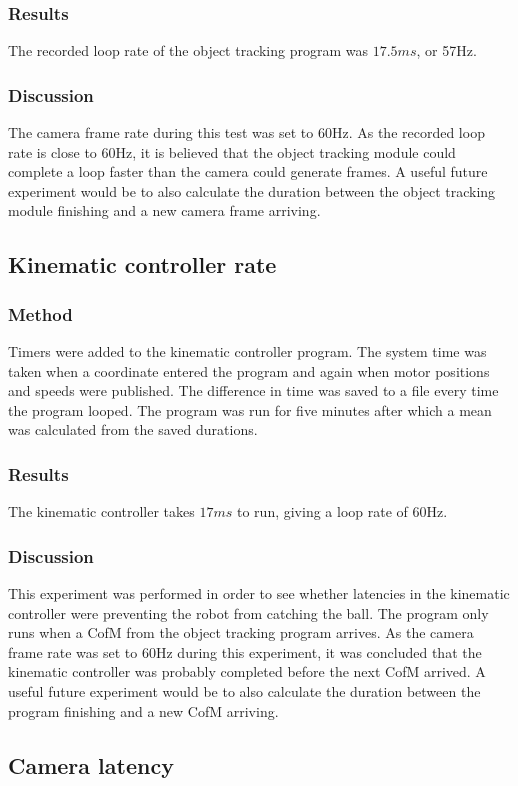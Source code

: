 \documentclass[conference]{IEEEtran}
\begin{document}
\subsubsection{Results}
The recorded loop rate of the object tracking program was $17.5ms$, or 57Hz.
\subsubsection{Discussion}
The camera frame rate during this test was set to 60Hz. As the recorded loop rate is close to 60Hz, it is believed that the object tracking module could complete a loop faster than the camera could generate frames. A useful future experiment would be to also calculate the duration between the object tracking module finishing and a new camera frame arriving.


\subsection{Kinematic controller rate}
\subsubsection{Method}
Timers were added to the kinematic controller program. The system time was taken when a coordinate entered the program and again when motor positions and speeds were published. The difference in time was saved to a file every time the program looped. The program was run for five minutes after which a mean was calculated from the saved durations.
\subsubsection{Results}
The kinematic controller takes $17ms$ to run, giving a loop rate of 60Hz.
\subsubsection{Discussion}
This experiment was performed in order to see whether latencies in the kinematic controller were preventing the robot from catching the ball. The program only runs when a CofM from the object tracking program arrives. As the camera frame rate was set to 60Hz during this experiment, it was concluded that the kinematic controller was probably completed before the next CofM arrived. A useful future experiment would be to also calculate the duration between the program finishing and a new CofM arriving. 

\subsection{Camera latency}
\end{document}
